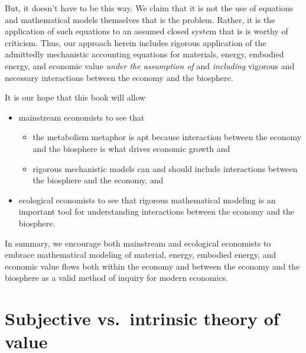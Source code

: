 But, it doesn't have to be this way.
We claim that it is not the use of equations 
and mathematical models themselves that is the problem.
Rather, it is the application of such equations 
to an assumed closed system
that is is worthy of criticism.
Thus, our approach herein includes rigorous application of the 
admittedly mechanistic accounting equations 
for materials, energy, embodied energy, and economic value
\emph{under the assumption of} and \emph{including} 
vigorous and necessary interactions between
the economy and the biosphere.

It is our hope that this book will allow

\begin{itemize}
	\item{mainstream economists to see that}
	\begin{itemize}
		\item{the metabolism metaphor is apt because 
		interaction between the economy and the biosphere is 
		what drives economic growth and}
		\item{rigorous mechanistic models can and should include 
		interactions between the biosphere and the economy, and} 
	\end{itemize}
	\item{ecological economists to see that rigorous mathematical modeling
	is an important tool for understanding interactions
	between the economy and the biosphere.}
\end{itemize}

In summary, we encourage both mainstream and ecological economists
to embrace mathematical modeling of 
material, 
energy, 
embodied energy, 
and economic value flows
both within the economy and between the economy and the biosphere
as a valid method of inquiry for modern economics.



\section{Subjective vs.\ intrinsic theory of value}
\label{sec:theory of value}

